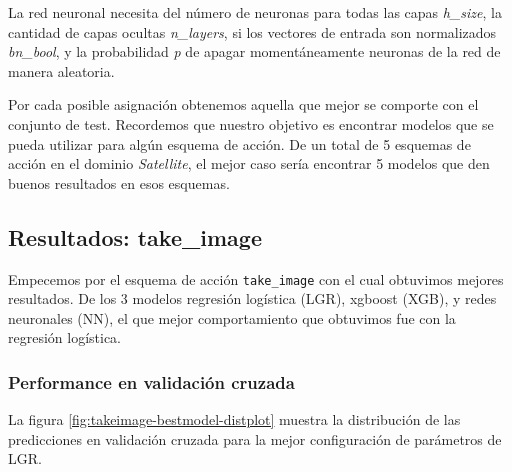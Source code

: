 La red neuronal necesita del número de neuronas para todas las capas
\emph{h\_size}, la cantidad de capas ocultas \emph{n\_layers}, si los vectores
de entrada son normalizados \emph{bn\_bool}, y la probabilidad  \emph{p} de apagar momentáneamente neuronas de la red de manera
aleatoria.

Por cada posible asignación obtenemos aquella que mejor se comporte con el conjunto de test. Recordemos que nuestro objetivo es encontrar modelos que se pueda utilizar para algún esquema de acción. De un total de 5 esquemas de acción en el dominio \emph{Satellite}, el mejor caso sería encontrar 5 modelos que den buenos resultados en esos esquemas.

\subsection{Resultados: take\_image}

Empecemos por el esquema de acción \verb|take_image|
con el cual obtuvimos mejores resultados. De los 3 modelos
regresión logística (LGR), xgboost (XGB), y redes neuronales
(NN), el que mejor comportamiento que obtuvimos fue con la regresión
logística. 

\subsubsection{Performance en validación cruzada}

La figura \ref{fig:takeimage-bestmodel-distplot} muestra
la distribución de las predicciones en validación cruzada
para la mejor configuración de parámetros de LGR.


